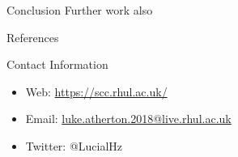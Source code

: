 \documentclass[final]{beamer}
\newlength{\onecolwid}
\begin{document}
\begin{frame}[t]
\begin{columns}[t]
\begin{column}{\onecolwid}
\begin{block}{Conclusion}
Further work also

\end{block}

\vspace*{1cm}
\begin{block}{References}

\nocite{*} %
\small{
}

\end{block}



\begin{alertblock}{Contact Information}

\begin{itemize}
\item Web: \href{https://scc.rhul.ac.uk/}{https://scc.rhul.ac.uk/}
\item Email: \href{luke.atherton.2018@live.rhul.ac.uk}{luke.atherton.2018@live.rhul.ac.uk}
\item Twitter: @LucialHz
\end{itemize}

\end{alertblock}


\end{column} %

\end{columns} %

\end{frame} %
\end{document}
